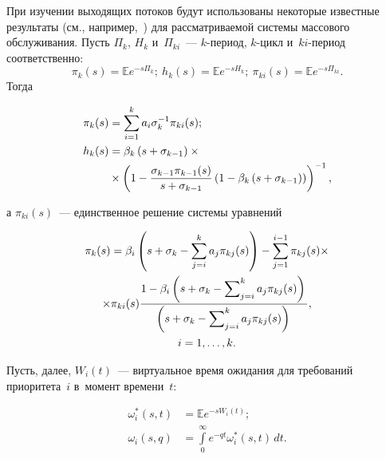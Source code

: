 \begin{multicols}{2}
При изучении выходящих потоков будут использованы некоторые известные результаты (см.,
 например,~\cite{5-us}) для рассматриваемой системы массового обслуживания.
Пусть $\Pi_k$, $H_k$ и~$\Pi_{ki}$~--- \mbox{$k$-пе}\-ри\-од, $k$-цикл и~$ki$-пе\-ри\-од соответственно:
\begin{equation*}
\pi_k(s)=\mathbb{E} e^{-s\Pi_k};\ h_k(s)=\mathbb{E} e^{-s H_k};\
 \pi_{ki}(s)=\mathbb{E} e^{-s\Pi_{ki}}.
\end{equation*}
Тогда

\vspace*{-6pt}

\noindent
\begin{align*}
\pi_k(s)&=\sum\limits_{i=1}^ka_i\sigma_k^{-1}\pi_{ki}(s);\\
 h_k(s)&=\beta_k\left(s+\sigma_{k-1}\right)\times{}\\
 &{}\times
\left(1-\displaystyle\frac{\displaystyle \sigma_{k-1}\pi_{k-1}(s)\mathstrut}{\displaystyle s+\sigma_{k-1}\mathstrut}
\left(1-\beta_k\left(s+\sigma_{k-1}\right)\right)\right)^{-1},
\end{align*}

\vspace*{-6pt}

\noindent
а $\pi_{ki}(s)$~--- единственное решение системы уравнений

\vspace*{-6pt}

\noindent
\begin{multline*}
\pi_k(s)=\beta_i\left(s+\sigma_k-\sum\limits_{j=i}^ka_j\pi_{kj}(s)\right)-
\sum\limits_{j=1}^{i-1}\pi_{kj}(s)\times\\
\times\pi_{ki}(s)\displaystyle\frac{\displaystyle 1-\beta_i\left(s+\sigma_k-\sum\nolimits_{j=i}^ka_j\pi_{kj}(s)\right)\mathstrut}{\displaystyle \left(s+\sigma_k-\sum\nolimits_{j=i}^ka_j\pi_{kj}(s)\right)\mathstrut},\\
 i=1,\ldots,k.
\end{multline*}

\vspace*{-2pt}


Пусть, далее, $W_i(t)$~--- виртуальное время ожидания для требований приоритета~$i$ в~момент времени~$t$:

\noindent
\begin{align*}
\omega_i^{*}(s,t)&=\mathbb{E} e^{-sW_i(t)};\\
 \omega_i(s,q)&=\int\limits_0^{\infty}e^{-qt}
\omega_i^{*}(s,t)\,dt.
\end{align*}




\end{multicols}
